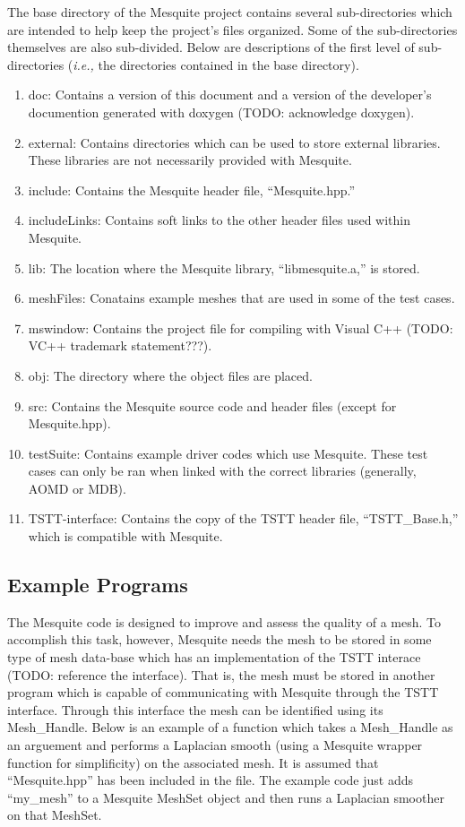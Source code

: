 \documentclass[psfig]{article}
\begin{document}
The base directory of the Mesquite project contains several
sub-directories which are intended to help keep the project's
files organized.  Some of the sub-directories themselves are
also sub-divided.  Below are descriptions of the first level
of sub-directories ({\it i.e.,} the directories contained in the
base directory).
\begin{enumerate}
\item doc:  Contains a version of this document and a version of
the developer's documention generated with doxygen (TODO: acknowledge
doxygen).
\item external:  Contains directories which can be used to store external
libraries.  These libraries are not necessarily provided with Mesquite.
\item include:  Contains the Mesquite header file, ``Mesquite.hpp.''
\item includeLinks:  Contains soft links to the other header files
used within Mesquite.  
\item lib:  The location where the Mesquite library, ``libmesquite.a,'' is
stored.
\item meshFiles:  Conatains example meshes that are used in some of
the test cases.
\item mswindow:  Contains the project file for compiling with Visual C++
(TODO: VC++ trademark statement???).
\item obj:  The directory where the object files are placed.
\item src:  Contains the Mesquite source code and header files (except for
Mesquite.hpp).
\item testSuite:  Contains example driver codes which use Mesquite.  These
test cases can only be ran when linked with the correct libraries (generally,
AOMD or MDB).
\item TSTT-interface:  Contains the copy of the TSTT header file,
``TSTT\_Base.h,'' which is compatible with Mesquite.
\end{enumerate}
\subsection{Example Programs}
The Mesquite code is designed to improve and assess the quality of
a mesh.  To accomplish this task, however, Mesquite needs the mesh
to be stored in some type of mesh data-base which has an implementation
of the TSTT interace  (TODO: reference the interface).  That is, the
mesh must be stored in another program which is capable of communicating
with Mesquite through the TSTT interface.  Through this interface
the mesh can be identified using its Mesh\_Handle.  Below is an example
of a function which takes a Mesh\_Handle as an arguement and performs
a Laplacian smooth (using a Mesquite wrapper function for simplificity)
on the associated mesh.  It is assumed that ``Mesquite.hpp'' has been
included in the file.  The example code just adds ``my\_mesh'' to a
Mesquite MeshSet object and then runs a Laplacian smoother on that
MeshSet.
\end{document}
